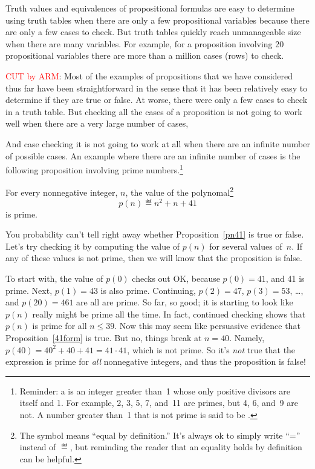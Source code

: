 Truth values and equivalences of propositional formulas are easy to
determine using truth tables when there are only a few propositional
variables because there are only a few cases to check.  But truth tables
quickly reach unmanageable size when there are many variables.  For
example, for a proposition involving 20 propositional
variables there are more than a million cases (rows) to check.  
\begin{editingnotes}
 \textcolor{red}{CUT by ARM}:
  Most of the examples of propositions that we have considered thus far
  have been straightforward in the sense that it has been relatively easy
  to determine if they are true or false.  At worse, there were only a few
  cases to check in a truth table.  But checking all the cases of a
  proposition is not going to work well when there are a very large number
  of cases,
\end{editingnotes}
 And case checking it is not going to work at all when there
are an infinite number of possible cases.  An example where there are an
infinite number of cases is the following proposition involving prime
numbers.\footnote{Reminder: a  is an integer greater than~1
  whose only positive divisors are itself and 1.  For example, 2, 3, 5, 7,
  and~11 are primes, but 4, 6, and~9 are not.  A number greater than~1
  that is not prime is said to be .}
\begin{proposition}\label{41form}
For every nonnegative integer, $n$, the value of the
polynomal\footnote{The symbol \term{$\eqdef$} means ``equal by
  definition.''  It's always ok to simply write ``='' instead of
  $\eqdef$, but reminding the reader that an equality holds by
  definition can be helpful.}
\begin{equation}\label{pn41}
p(n) \eqdef  n^2 + n + 41
\end{equation}
is prime.
\end{proposition}
You probability can't tell right away whether Proposition~\ref{pn41}
is true or false.  Let's try checking it by computing the value of
$p(n)$ for several values of~$n$.  If any of these values is not
prime, then we will know that the proposition is false.

To start with, the value of $p(0)$ checks out OK, because $p(0) = 41$,
and 41 is prime.  Next, $p(1) = 43$ is also prime.  Continuing, $p(2)
= 47$, $p(3)=53$, \dots, and $p(20) = 461$ are all are prime.  So far,
so good; it is starting to look like $p(n)$ really might be prime all
the time.  In fact, continued checking shows that $p(n)$ is prime for
all $n \le 39$.  Now this may seem like persuasive evidence that
Proposition~\ref{41form} is true.  But no, things break at $n=40$.
Namely, $p(40) = 40^2 + 40 + 41 = 41 \cdot 41$, which is not prime.
So it's \emph{not} true that the expression is prime for \emph{all}
nonnegative integers, and thus the proposition is false!

